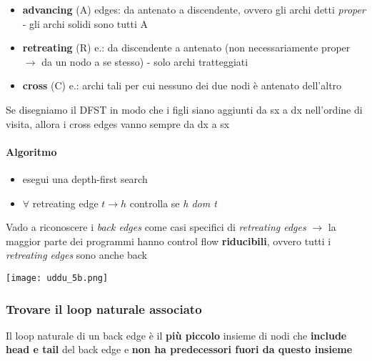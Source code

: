 \begin{itemize}
  \item \textbf{advancing} (A) edges: da antenato a discendente, ovvero gli archi detti \textit{proper} - gli archi solidi sono tutti A
  \item \textbf{retreating} (R) e.: da discendente a antenato (non necessariamente proper $\rightarrow$ da un nodo a se stesso) - solo archi tratteggiati
  \item \textbf{cross} (C) e.: archi tali per cui nessuno dei due nodi \`e antenato dell'altro
\end{itemize}

\begin{emphasize}
  Se disegniamo il DFST in modo che i figli siano aggiunti da sx a dx nell'ordine di visita, allora i cross edges vanno sempre da dx a sx
\end{emphasize}

\noindent \begin{minipage}[c]{.67\textwidth}
  \paragraph{Algoritmo}

  \begin{itemize}
    \item esegui una depth-first search
    \item $\forall$ retreating edge $t \rightarrow h$ controlla se \textit{h dom t}
  \end{itemize}


  \begin{emphasize}
    Vado a riconoscere i \textit{back edges} come casi specifici di \textit{retreating edges} $\rightarrow$ la maggior parte dei programmi hanno control flow \textbf{riducibili}, ovvero tutti i \textit{retreating edges} sono anche back
  \end{emphasize}
\end{minipage}\hfill
\begin{minipage}[c]{.3\textwidth}
  \texttt{[image: uddu\_5b.png]}
\end{minipage}

\subsubsection{Trovare il loop naturale associato}

Il loop naturale di un back edge \`e il \textbf{pi\`u piccolo} insieme di nodi che \textbf{include head e tail} del back edge e \textbf{non ha predecessori fuori da questo insieme} 

